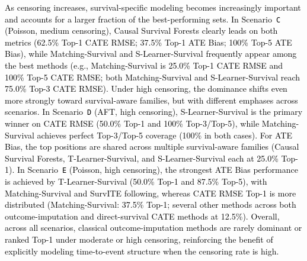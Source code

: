 \documentclass{article} %
\newcommand{\rebuttal}[1]{\textcolor{black}{#1}}
\begin{document}
\rebuttal{As censoring increases, survival-specific modeling becomes increasingly important and accounts for a larger fraction of the best-performing sets. In Scenario~\texttt{C} (Poisson, medium censoring), Causal Survival Forests clearly leads on both metrics (62.5\% Top-1 CATE RMSE; 37.5\% Top-1 ATE Bias; 100\% Top-5 ATE Bias), while Matching-Survival and S-Learner-Survival frequently appear among the best methods (e.g., Matching-Survival is 25.0\% Top-1 CATE RMSE and 100\% Top-5 CATE RMSE; both Matching-Survival and S-Learner-Survival reach 75.0\% Top-3 CATE RMSE). Under high censoring, the dominance shifts even more strongly toward survival-aware families, but with different emphases across scenarios. In Scenario~\texttt{D} (AFT, high censoring), S-Learner-Survival is the primary winner on CATE RMSE (50.0\% Top-1 and 100\% Top-3/Top-5), while Matching-Survival achieves perfect Top-3/Top-5 coverage (100\% in both cases). For ATE Bias, the top positions are shared across multiple survival-aware families (Causal Survival Forests, T-Learner-Survival, and S-Learner-Survival each at 25.0\% Top-1). In Scenario~\texttt{E} (Poisson, high censoring), the strongest ATE Bias performance is achieved by T-Learner-Survival (50.0\% Top-1 and 87.5\% Top-5), with Matching-Survival and SurvITE following, whereas CATE RMSE Top-1 is more distributed (Matching-Survival: 37.5\% Top-1; several other methods across both outcome-imputation and direct-survival CATE methods at 12.5\%). Overall, across all scenarios, classical outcome-imputation methods are rarely dominant or ranked Top-1 under moderate or high censoring, reinforcing the benefit of explicitly modeling time-to-event structure when the censoring rate is high.}
\end{document}
